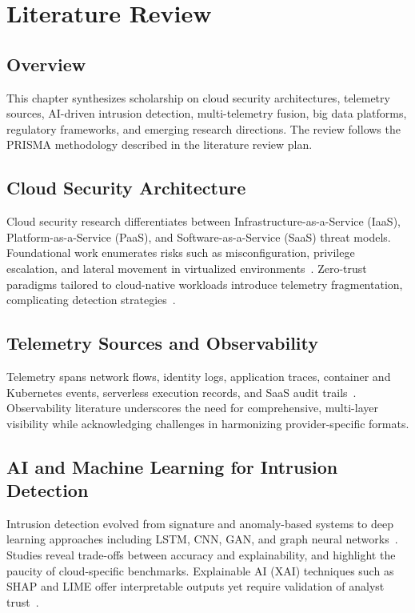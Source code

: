 \chapter{Literature Review}\label{chap:lit}
\section{Overview}
This chapter synthesizes scholarship on cloud security architectures, telemetry sources, AI-driven intrusion detection, multi-telemetry fusion, big data platforms, regulatory frameworks, and emerging research directions. The review follows the PRISMA methodology described in the literature review plan.

\section{Cloud Security Architecture}
Cloud security research differentiates between Infrastructure-as-a-Service (IaaS), Platform-as-a-Service (PaaS), and Software-as-a-Service (SaaS) threat models. Foundational work enumerates risks such as misconfiguration, privilege escalation, and lateral movement in virtualized environments~\cite{hashizume2013analysis}. Zero-trust paradigms tailored to cloud-native workloads introduce telemetry fragmentation, complicating detection strategies~\cite{nist800207}.

\section{Telemetry Sources and Observability}
Telemetry spans network flows, identity logs, application traces, container and Kubernetes events, serverless execution records, and SaaS audit trails~\cite{awscloudtrail2023,opentelemetry2023}. Observability literature underscores the need for comprehensive, multi-layer visibility while acknowledging challenges in harmonizing provider-specific formats.

\section{AI and Machine Learning for Intrusion Detection}
Intrusion detection evolved from signature and anomaly-based systems to deep learning approaches including LSTM, CNN, GAN, and graph neural networks~\cite{chandola2009anomaly,zhang2022ids,wu2021gnnreview}. Studies reveal trade-offs between accuracy and explainability, and highlight the paucity of cloud-specific benchmarks. Explainable AI (XAI) techniques such as SHAP and LIME offer interpretable outputs yet require validation of analyst trust~\cite{lundberg2017shap,ribeiro2016lime}.

